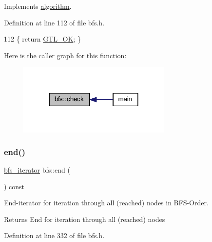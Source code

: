 Implements \mbox{\hyperlink{classalgorithm_a76361fb03ad1cf643affc51821e43bed}{algorithm}}.



Definition at line 112 of file bfs.\+h.


\begin{DoxyCode}
112 \{ \textcolor{keywordflow}{return} \mbox{\hyperlink{classalgorithm_af1a0078e153aa99c24f9bdf0d97f6710a5114c20e4a96a76b5de9f28bf15e282b}{GTL\_OK}}; \}
\end{DoxyCode}
Here is the caller graph for this function\+:
\nopagebreak
\begin{figure}[H]
\begin{center}
\leavevmode
\includegraphics[width=216pt]{classbfs_aafdf63b57eaceb5d95f441be0f9c77bb_icgraph}
\end{center}
\end{figure}
\mbox{\label{classbfs_ac35b3d3c37d33eb80adb752e17a60df9}} 
\subsubsection{\texorpdfstring{end()}{end()}}
{\footnotesize\ttfamily \mbox{\hyperlink{classbfs_a1035f068a96de0370789ec315aef4f73}{bfs\+\_\+iterator}} bfs\+::end (\begin{DoxyParamCaption}{ }\end{DoxyParamCaption}) const\hspace{0.3cm}{\ttfamily [inline]}}



End-\/iterator for iteration through all (reached) nodes in B\+F\+S-\/\+Order. 

\begin{DoxyReturn}{Returns}
End for iteration through all (reached) nodes 
\end{DoxyReturn}


Definition at line 332 of file bfs.\+h.


